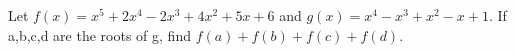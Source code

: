 Let $f(x)=x^5+2x^4-2x^3+4x^2+5x+6$ and $g(x)=x^4-x^3+x^2-x+1$. If a,b,c,d are the roots of g, find $f(a)+f(b)+f(c)+f(d)$.

